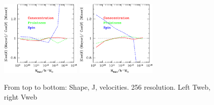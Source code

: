 \documentclass[usenatbib]{mn2e}
\begin{document}
\begin{figure}
\includegraphics[width=0.35\textwidth]{../tmp/Type/vT_Web_256.ps}
\includegraphics[width=0.35\textwidth]{../tmp/Type/vV_Web_256.ps}
\caption{From top to bottom: Shape, J, velocities. 256 resolution. Left Tweb, right Vweb}
\end{figure}
\end{document}
